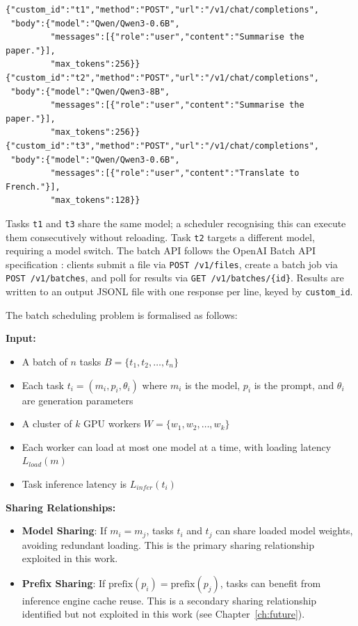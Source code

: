 \documentclass[logo,bsc,singlespacing,parskip,online]{infthesis}
\begin{document}
\begin{lstlisting}[language={},basicstyle=\ttfamily\small,frame=single,numbers=none]
{"custom_id":"t1","method":"POST","url":"/v1/chat/completions",
 "body":{"model":"Qwen/Qwen3-0.6B",
         "messages":[{"role":"user","content":"Summarise the paper."}],
         "max_tokens":256}}
{"custom_id":"t2","method":"POST","url":"/v1/chat/completions",
 "body":{"model":"Qwen/Qwen3-8B",
         "messages":[{"role":"user","content":"Summarise the paper."}],
         "max_tokens":256}}
{"custom_id":"t3","method":"POST","url":"/v1/chat/completions",
 "body":{"model":"Qwen/Qwen3-0.6B",
         "messages":[{"role":"user","content":"Translate to French."}],
         "max_tokens":128}}
\end{lstlisting}

Tasks \texttt{t1} and \texttt{t3} share the same model; a scheduler recognising this can execute them consecutively without reloading. Task \texttt{t2} targets a different model, requiring a model switch. The batch API follows the OpenAI Batch API specification \citep{openai_batch_api}: clients submit a file via \texttt{POST /v1/files}, create a batch job via \texttt{POST /v1/batches}, and poll for results via \texttt{GET /v1/batches/\{id\}}. Results are written to an output JSONL file with one response per line, keyed by \texttt{custom\_id}.

The batch scheduling problem is formalised as follows:

\textbf{Input:}
\begin{itemize}
\item A batch of $n$ tasks $B = \{t_1, t_2, \ldots, t_n\}$
\item Each task $t_i = (m_i, p_i, \theta_i)$ where $m_i$ is the model, $p_i$ is the prompt, and $\theta_i$ are generation parameters
\item A cluster of $k$ GPU workers $W = \{w_1, w_2, \ldots, w_k\}$
\item Each worker can load at most one model at a time, with loading latency $L_{load}(m)$
\item Task inference latency is $L_{infer}(t_i)$
\end{itemize}

\textbf{Sharing Relationships:}
\begin{itemize}
\item \textbf{Model Sharing}: If $m_i = m_j$, tasks $t_i$ and $t_j$ can share loaded model weights, avoiding redundant loading. This is the primary sharing relationship exploited in this work.
\item \textbf{Prefix Sharing}: If $\text{prefix}(p_i) = \text{prefix}(p_j)$, tasks can benefit from inference engine cache reuse. This is a secondary sharing relationship identified but not exploited in this work (see Chapter~\ref{ch:future}).
\end{itemize}
\end{document}
